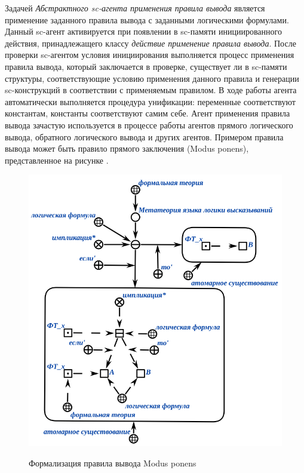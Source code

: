 Задачей \textit{Абстрактного sc-агента применения правила вывода} является применение заданного правила вывода с заданными логическими формулами. Данный sc-агент активируется при появлении в sc-памяти инициированного действия, принадлежащего классу \textit{действие применение правила вывода}. После проверки sc-агентом условия инициирования выполняется процесс применения правила вывода, который заключается в  проверке, существует ли в sc-памяти структуры, соответствующие условию применения данного правила и генерации sc-конструкций в соответствии с применяемым правилом. В ходе работы агента автоматически выполняется процедура унификации: переменные соответствуют константам, константы соответствуют самим себе. Агент применения правила вывода зачастую используется в процессе работы агентов прямого логического вывода, обратного логического вывода и других агентов. Примером правила вывода может быть правило прямого заключения (Modus ponens), представленное на рисунке \textit{}.

\begin{figure}[H]
	\caption{Формализация правила вывода Modus ponens}
	\includegraphics[scale=0.8]{author/part3/figures/Modus_ponens.png}
	\label{fig:modus_ponens_formalization}
\end{figure}

